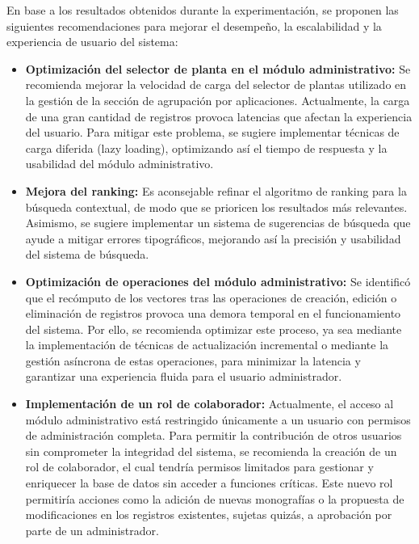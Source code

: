 \begin{recomendations}
    En base a los resultados obtenidos durante la experimentación, se proponen las siguientes recomendaciones para mejorar el desempeño, 
    la escalabilidad y la experiencia de usuario del sistema:
    \begin{itemize}
        \item \textbf{Optimización del selector de planta en el módulo administrativo:} 
        Se recomienda mejorar la velocidad de carga del selector de plantas utilizado en la gestión de la sección de 
        agrupación por aplicaciones. Actualmente, la carga de una gran cantidad de registros provoca 
        latencias que afectan la experiencia del usuario. Para mitigar este problema, se sugiere implementar 
        técnicas de carga diferida (lazy loading), optimizando así el tiempo de respuesta y la usabilidad 
        del módulo administrativo.
        \item \textbf{Mejora del ranking:} 
        Es aconsejable refinar el algoritmo de ranking para la búsqueda contextual, de modo que se prioricen los resultados 
        más relevantes. Asimismo, se sugiere implementar un sistema de sugerencias de búsqueda que ayude a mitigar errores 
        tipográficos, mejorando así la precisión y usabilidad del sistema de búsqueda.
        \item \textbf{Optimización de operaciones del módulo administrativo:} 
        Se identificó que el recómputo de los vectores tras las operaciones de creación, edición o eliminación de registros 
        provoca una demora temporal en el funcionamiento del sistema. Por ello, se recomienda optimizar este proceso, ya 
        sea mediante la implementación de técnicas de actualización incremental o mediante la gestión asíncrona de estas 
        operaciones, para minimizar la latencia y garantizar una experiencia fluida para el usuario administrador.
        \item \textbf{Implementación de un rol de colaborador:} 
        Actualmente, el acceso al módulo administrativo está restringido únicamente a un usuario con permisos de administración completa. 
        Para permitir la contribución de otros usuarios sin comprometer la integridad del sistema, se recomienda 
        la creación de un rol de colaborador, el cual tendría permisos limitados para gestionar y enriquecer la base 
        de datos sin acceder a funciones críticas. Este nuevo rol permitiría acciones como la adición de nuevas monografías 
        o la propuesta de modificaciones en los registros existentes, sujetas quizás, a aprobación por parte de un administrador. 

\end{itemize}
\end{recomendations}
